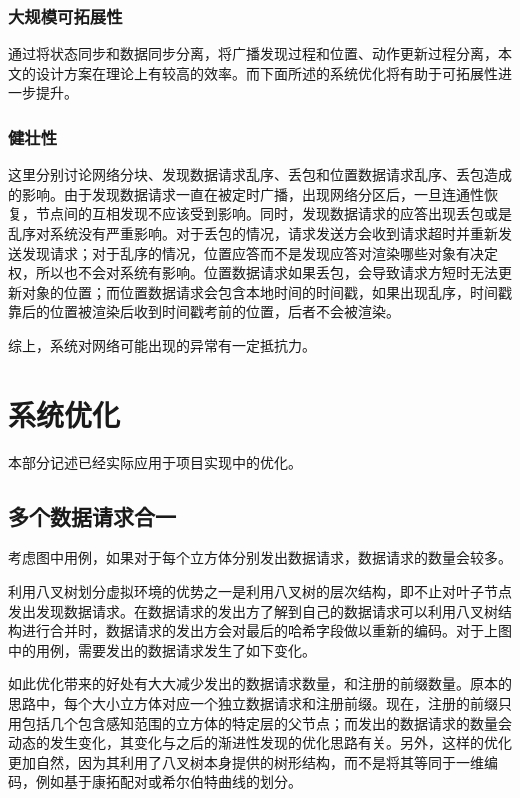 \subsubsection{大规模可拓展性}
通过将状态同步和数据同步分离，将广播发现过程和位置、动作更新过程分离，本文的设计方案在理论上有较高的效率。而下面所述的系统优化将有助于可拓展性进一步提升。
\subsubsection{健壮性}
这里分别讨论网络分块、发现数据请求乱序、丢包和位置数据请求乱序、丢包造成的影响。由于发现数据请求一直在被定时广播，出现网络分区后，一旦连通性恢复，节点间的互相发现不应该受到影响。同时，发现数据请求的应答出现丢包或是乱序对系统没有严重影响。对于丢包的情况，请求发送方会收到请求超时并重新发送发现请求；对于乱序的情况，位置应答而不是发现应答对渲染哪些对象有决定权，所以也不会对系统有影响。位置数据请求如果丢包，会导致请求方短时无法更新对象的位置；而位置数据请求会包含本地时间的时间戳，如果出现乱序，时间戳靠后的位置被渲染后收到时间戳考前的位置，后者不会被渲染。
\par
综上，系统对网络可能出现的异常有一定抵抗力。
\section{系统优化}
\label{OptimizationSection}
\par
本部分记述已经实际应用于项目实现中的优化。
\subsection{多个数据请求合一}
\label{MultiLevelOptimizationSection}
\par
考虑图中用例，如果对于每个立方体分别发出数据请求，数据请求的数量会较多。
\par
利用八叉树划分虚拟环境的优势之一是利用八叉树的层次结构，即不止对叶子节点发出发现数据请求。在数据请求的发出方了解到自己的数据请求可以利用八叉树结构进行合并时，数据请求的发出方会对最后的哈希字段做以重新的编码。对于上图中的用例，需要发出的数据请求发生了如下变化。
\par
如此优化带来的好处有大大减少发出的数据请求数量，和注册的前缀数量。原本的思路中，每个大小立方体对应一个独立数据请求和注册前缀。现在，注册的前缀只用包括几个包含感知范围的立方体的特定层的父节点；而发出的数据请求的数量会动态的发生变化，其变化与之后的渐进性发现的优化思路有关。另外，这样的优化更加自然，因为其利用了八叉树本身提供的树形结构，而不是将其等同于一维编码，例如基于康拓配对或希尔伯特曲线的划分。
\par
